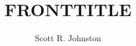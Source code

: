 \documentclass[hyperref=pdftex, presentation]{beamer}
\title[PAGETITLE] %
{FRONTTITLE}
\author[Scott Johnston]{Scott R. Johnston}
\institute {Stanford\\}
\date[\today]
\begin{document}
\titlepage
\end{document}
